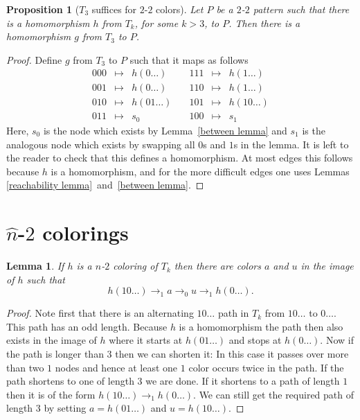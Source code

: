 \documentclass[a4paper]{article}
\newtheorem{lemma}[theorem]{Lemma}
\newtheorem{proposition}[theorem]{Proposition}
\begin{document}
\begin{proposition}[$T_3$ suffices for $2$-$2$ colors]
 Let $P$ be a $2$-$2$ pattern such that there is a homomorphism $h$ from
$T_k$, for some $k > 3$, to $P$. Then there is a homomorphism $g$ from
$T_3$ to $P$.
\end{proposition}
\begin{proof}
Define $g$ from $T_3$ to $P$ such that it maps as follows
\[
 \begin{array}{rcl}
 000 & \mapsto & h(0\dots) \\
 001 & \mapsto & h(0\dots) \\
 010 & \mapsto & h(01\dots) \\
 011 & \mapsto & s_0
 \end{array} \quad
 \begin{array}{rcl}
 111 & \mapsto & h(1\dots) \\
 110 & \mapsto & h(1\dots) \\
 101 & \mapsto & h(10\dots) \\
 100 & \mapsto & s_1
 \end{array}
\]
Here, $s_0$ is the node which exists by Lemma~\ref{between lemma} and
$s_1$ is the analogous node which exists by swapping all $0$s and $1$s
in the lemma. It is left to the reader to check that this defines a
homomorphism. At most edges this follows because $h$ is a homomorphism,
and for the more difficult edges one uses Lemmas \ref{reachability
lemma}~and~\ref{between lemma}.
\end{proof}

\section{$\hat{n}$-$2$ colorings}

\begin{lemma} \label{hat one}
 If $h$ is a $n$-$2$ coloring of $T_k$ then there are colors $a$
and $u$ in the image of $h$ such that
\[
 h(10\dots) \rightarrow_1 a \rightarrow_0 u \rightarrow_1 h(0\dots).
\]
\end{lemma}
\begin{proof}
 Note first that there is an alternating $10 \dots$ path in $T_k$ from
$10\dots$ to $0 \dots$. This path has an odd length. Because $h$ is a
homomorphism the path then also exists in the image of $h$ where it
starts at $h(01\dots)$ and stops at $h(0\dots)$. Now if the path is
longer than $3$ then we can shorten it: In this case it passes over more
than two $1$ nodes and hence at least one $1$ color occurs twice in the
path. If the path shortens to one of length $3$ we are done. If it
shortens to a path of length $1$ then it is of the form $h(10\dots)
\rightarrow_1 h(0\dots)$. We can still get the required path of length
$3$ by setting $a = h(01\dots)$ and $u = h(10\dots)$.
\end{proof}
\end{document}
